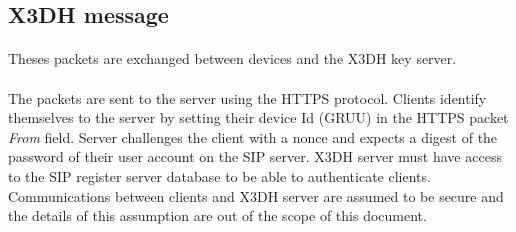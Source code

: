 \documentclass[a4paper,11pt]{article}
\begin{document}
  \subsection{X3DH message}
    \paragraph{}Theses packets are exchanged between devices and the X3DH key server.
    \paragraph*{}The packets are sent to the server using the HTTPS protocol. Clients identify themselves to the server by setting their device Id (GRUU) in the HTTPS packet \textit{From} field. Server challenges the client with a nonce and expects a digest of the password of their user account on the SIP server. X3DH server must have access to the SIP register server database to be able to authenticate clients. Communications between clients and X3DH server are assumed to be secure and the details of this assumption are out of the scope of this document.
\end{document}
